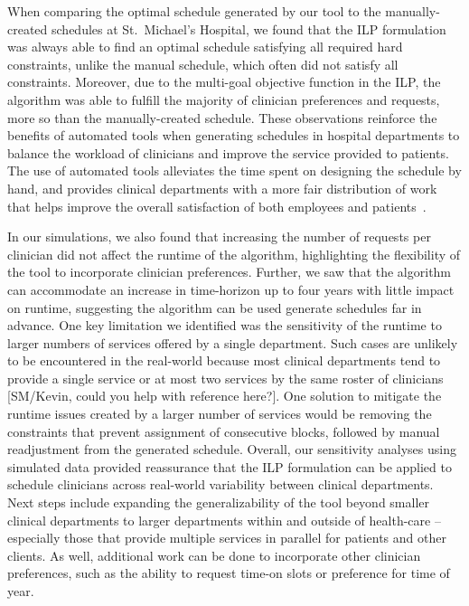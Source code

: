 When comparing the optimal schedule generated by our tool to the
manually-created schedules at St.\ Michael's Hospital, we found that the ILP
formulation was always able to find an optimal schedule satisfying all required
hard constraints, unlike the manual schedule, which often did not satisfy all
constraints. Moreover, due to the multi-goal objective function in
the ILP, the algorithm was able to fulfill the majority of clinician
preferences and requests, more so than the manually-created schedule. These
observations reinforce the benefits of automated tools when generating schedules
in hospital departments to balance the workload of clinicians and improve the
service provided to patients. The use of automated tools alleviates the time
spent on designing the schedule by hand, and provides clinical departments with
a more fair distribution of work that helps improve the overall satisfaction of
both employees and patients~\cite{silvestro_evaluation_2000}.  %

In our simulations, we also found that increasing the number of requests per
clinician did not affect the runtime of the algorithm, highlighting the
flexibility of the tool to incorporate clinician preferences. Further, we saw
that the algorithm can accommodate an increase in time-horizon up to four years
with little impact on runtime, suggesting the algorithm can be used generate
schedules far in advance. One key limitation we identified was the sensitivity
of the runtime to larger numbers of services offered by a single department.
Such cases are unlikely to be encountered in the real-world because most
clinical departments tend to provide a single service or at most two services by
the same roster of clinicians [{\color{red}SM/Kevin, could you help with
	reference here?}]. One solution to mitigate the runtime issues created by a
larger number of services would be removing the constraints that prevent
assignment of consecutive blocks, followed by manual readjustment from the
generated schedule. %
Overall, our sensitivity analyses using simulated data provided reassurance that
the ILP formulation can be applied to schedule clinicians across real-world
variability between clinical departments. %
Next steps include expanding the generalizability of the tool beyond smaller
clinical departments to larger departments within and outside of health-care --
especially those that provide multiple services in parallel for patients and
other clients. As well, additional work can be done to incorporate other
clinician preferences, such as the ability to request time-on slots or preference
for time of year.
